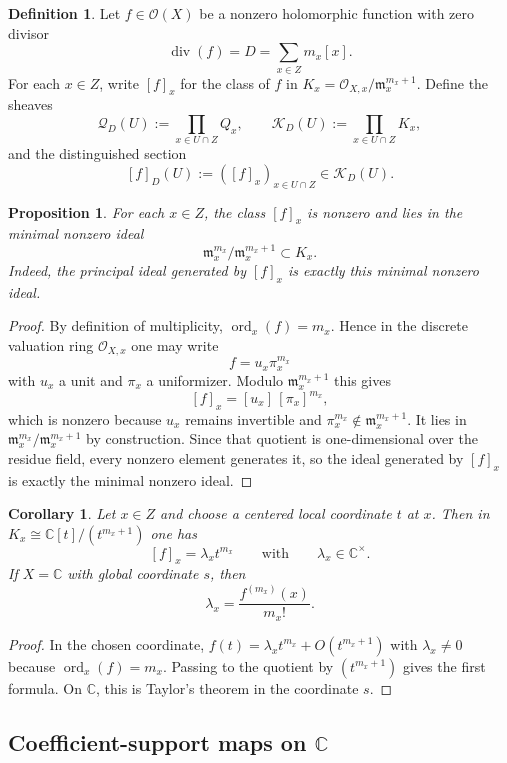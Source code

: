 \documentclass[11pt,a4paper]{article}
\numberwithin{equation}{section}
\newtheorem{proposition}[theorem]{Proposition}
\newtheorem{corollary}[theorem]{Corollary}
\theoremstyle{definition}
\newtheorem{definition}[theorem]{Definition}
\theoremstyle{remark}
\DeclareMathOperator{\ord}{ord}
\newcommand{\CC}{\mathbb C}
\newcommand{\cO}{\mathcal O}
\newcommand{\cQ}{\mathcal Q}
\newcommand{\cK}{\mathcal K}
\begin{document}
\begin{definition}
Let $f\in\cO(X)$ be a nonzero holomorphic function with zero divisor
\[
\operatorname{div}(f)=D=\sum_{x\in Z}m_x[x].
\]
For each $x\in Z$, write $[f]_x$ for the class of $f$ in $K_x=\cO_{X,x}/\mathfrak m_x^{m_x+1}$.  Define the sheaves
\[
\cQ_D(U):=\prod_{x\in U\cap Z}Q_x,
\qquad
\cK_D(U):=\prod_{x\in U\cap Z}K_x,
\]
and the distinguished section
\[
[f]_D(U):=([f]_x)_{x\in U\cap Z}\in\cK_D(U).
\]
\end{definition}

\begin{proposition}\label{prop:derivative-enhanced-local}
For each $x\in Z$, the class $[f]_x$ is nonzero and lies in the minimal nonzero ideal
\[
\mathfrak m_x^{m_x}/\mathfrak m_x^{m_x+1}\subset K_x.
\]
Indeed, the principal ideal generated by $[f]_x$ is exactly this minimal nonzero ideal.
\end{proposition}

\begin{proof}
By definition of multiplicity, $\ord_x(f)=m_x$.  Hence in the discrete valuation ring $\cO_{X,x}$ one may write
\[
f=u_x\pi_x^{m_x}
\]
with $u_x$ a unit and $\pi_x$ a uniformizer.  Modulo $\mathfrak m_x^{m_x+1}$ this gives
\[
[f]_x=[u_x]\,[\pi_x]^{m_x},
\]
which is nonzero because $u_x$ remains invertible and $\pi_x^{m_x}\notin\mathfrak m_x^{m_x+1}$.  It lies in $\mathfrak m_x^{m_x}/\mathfrak m_x^{m_x+1}$ by construction.  Since that quotient is one-dimensional over the residue field, every nonzero element generates it, so the ideal generated by $[f]_x$ is exactly the minimal nonzero ideal.
\end{proof}

\begin{corollary}\label{cor:coordinate-derivative}
Let $x\in Z$ and choose a centered local coordinate $t$ at $x$.  Then in $K_x\cong\CC[t]/(t^{m_x+1})$ one has
\[
[f]_x=\lambda_x t^{m_x}
\qquad\text{with}\qquad
\lambda_x\in\CC^\times.
\]
If $X=\CC$ with global coordinate $s$, then
\[
\lambda_x=\frac{f^{(m_x)}(x)}{m_x!}.
\]
\end{corollary}

\begin{proof}
In the chosen coordinate, $f(t)=\lambda_x t^{m_x}+O(t^{m_x+1})$ with $\lambda_x\neq0$ because $\ord_x(f)=m_x$.  Passing to the quotient by $(t^{m_x+1})$ gives the first formula.  On $\CC$, this is Taylor's theorem in the coordinate $s$.
\end{proof}

\subsection{Coefficient-support maps on $\CC$}
\end{document}
